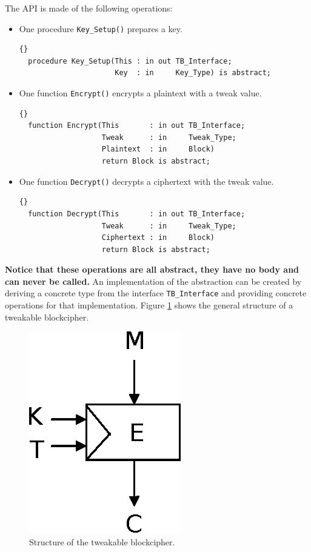  The API is made of the following operations:
\begin{itemize}
\item One procedure \texttt{Key\_Setup()} prepares a key.
\begin{lstlisting}{}
  procedure Key_Setup(This : in out TB_Interface;
                      Key  : in     Key_Type) is abstract;
\end{lstlisting}
\item One function \texttt{Encrypt()} encrypts a plaintext with a tweak value.
\begin{lstlisting}{}
  function Encrypt(This       : in out TB_Interface;
                   Tweak      : in     Tweak_Type;
                   Plaintext  : in     Block)
                   return Block is abstract;
\end{lstlisting}
\item One function \texttt{Decrypt()} decrypts a ciphertext with the
  tweak value.
\begin{lstlisting}{}
  function Decrypt(This       : in out TB_Interface;
                   Tweak      : in     Tweak_Type;
                   Ciphertext : in     Block)
                   return Block is abstract;
\end{lstlisting}
\end{itemize}
\textbf{Notice that these operations are all abstract, they have no
  body and can never be called.} An implementation of the abstraction
can be created by deriving a concrete type from the interface
\texttt{TB\_Interface} and providing concrete operations for that
implementation. Figure \ref{TweakBlock} shows the general structure of
a tweakable blockcipher.
\begin{figure}[htp]
\centering
\includegraphics[scale=1]{./images/Tweak_BC}
\caption{Structure of the tweakable blockcipher.}\label{TweakBlock}
\end{figure}


